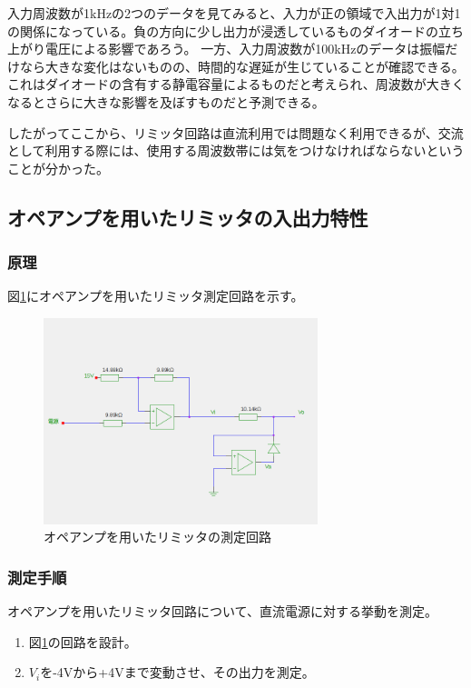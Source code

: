 \documentclass[11pt,a4j]{jsarticle}
\begin{document}
    入力周波数が1kHzの2つのデータを見てみると、入力が正の領域で入出力が1対1の関係になっている。負の方向に少し出力が浸透しているものダイオードの立ち上がり電圧による影響であろう。
    一方、入力周波数が100kHzのデータは振幅だけなら大きな変化はないものの、時間的な遅延が生じていることが確認できる。これはダイオードの含有する静電容量によるものだと考えられ、周波数が大きくなるとさらに大きな影響を及ぼすものだと予測できる。
    
    したがってここから、リミッタ回路は直流利用では問題なく利用できるが、交流として利用する際には、使用する周波数帯には気をつけなければならないということが分かった。
    
    
  \subsection{オペアンプを用いたリミッタの入出力特性}
   \subsubsection{原理}
    
    図\ref{fig:amp_tokusei}にオペアンプを用いたリミッタ測定回路を示す。
    
    \begin{figure}[htbp]
  \centering
  \includegraphics[width=8cm,clip]{amp_tokusei.png}
  \caption{オペアンプを用いたリミッタの測定回路}
  \label{fig:amp_tokusei}
 \end{figure}%
    
   \subsubsection{測定手順}
    オペアンプを用いたリミッタ回路について、直流電源に対する挙動を測定。
    \begin{enumerate}
    \item 図\ref{fig:amp_tokusei}の回路を設計。
    \item $V_i$を-4Vから+4Vまで変動させ、その出力を測定。
    \end{enumerate}
    
\end{document}
